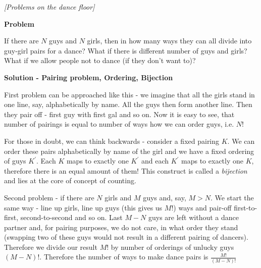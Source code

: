 \begin{problem}
\textit{[Problems on the dance floor]}

\textbf{Problem}

If there are $N$ guys and $N$ girls, then in how many ways they can all divide into guy-girl pairs for a dance? What if there is different number of guys and girls? What if we allow people not to dance (if they don't want to)?


\textbf{Solution - Pairing problem, Ordering, Bijection}

First problem can be approached like this - we imagine that all the girls stand in one line, say, alphabetically by name. All the guys then form another line. Then they pair off - first guy with first gal and so on. Now it is easy to see, that number of pairings is equal to number of ways how we can order guys, i.e. $N!$ 

For those in doubt, we can think backwards - consider a fixed pairing $K$. We can order these pairs alphabetically by name of the girl and we have a fixed ordering of guys $K^\prime$. Each $K$ maps to exactly one $K^\prime$ and each $K^\prime$ maps to exactly one $K$, therefore there is an equal amount of them! This construct is called a \textit{bijection} and lies at the core of concept of counting. 

Second problem - if there are $N$ girls and $M$ guys and, say, $M>N$. 
We start the same way - line up girls, line up guys (this gives us $M!$) ways and pair-off first-to-first, second-to-second and so on.  Last $M-N$ guys are left without a dance partner and, for pairing purposes, we do not care, in what order they stand (swapping two of these guys would not result in a different pairing of dancers).  Therefore we divide our result $M!$ by number of orderings of unlucky guys $(M-N)!$. Therefore the number of ways to make dance pairs is $\frac{M!}{(M-N)!}$

\end{problem}
%
\filbreak

